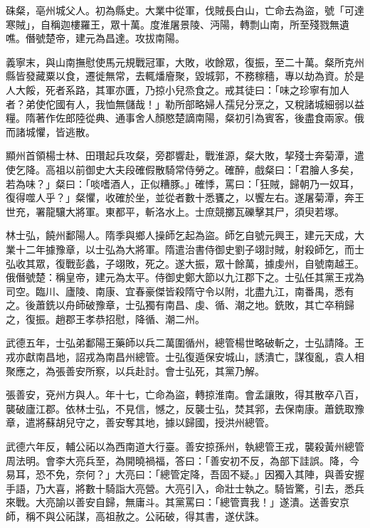 \begin{pinyinscope}
 硃粲，亳州城父人。初為縣史。大業中從軍，伐賊長白山，亡命去為盜，號「可達寒賊」，自稱迦樓羅王，眾十萬。度淮屠景陵、沔陽，轉剽山南，所至殘戮無遺噍。僭號楚帝，建元為昌達。攻拔南陽。



 義寧末，與山南撫慰使馬元規戰冠軍，大敗，收餘眾，復振，至二十萬。粲所克州縣皆發藏粟以食，遷徙無常，去輒燔廥聚，毀城郭，不務稼穡，專以劫為資。於是人大餒，死者系路，其軍亦匱，乃掠小兒烝食之。戒其徒曰：「味之珍寧有加人者？弟使佗國有人，我恤無儲哉！」勒所部略婦人孺兒分烹之，又稅諸城細弱以益糧。隋著作佐郎陸從典、通事舍人顏愍楚謫南陽，粲初引為賓客，後盡食兩家。俄而諸城懼，皆逃散。



 顯州首領楊士林、田瓚起兵攻粲，旁郡響赴，戰淮源，粲大敗，挈殘士奔菊潭，遣使乞降。高祖以前御史大夫段確假散騎常侍勞之。確醉，戲粲曰：「君膾人多矣，若為味？」粲曰：「啖嗜酒人，正似糟豚。」確悸，罵曰：「狂賊，歸朝乃一奴耳，復得噬人乎？」粲懼，收確於坐，並從者數十悉饔之，以饗左右。遂屠菊潭，奔王世充，署龍驤大將軍。東都平，斬洛水上。士庶競擲瓦礫擊其尸，須臾若塚。



 林士弘，饒州鄱陽人。隋季與鄉人操師乞起為盜。師乞自號元興王，建元天成，大業十二年據豫章，以士弘為大將軍。隋遣治書侍御史劉子翊討賊，射殺師乞，而士弘收其眾，復戰彭蠡，子翊敗，死之。遂大振，眾十餘萬，據虔州，自號南越王。俄僭號楚：稱皇帝，建元為太平。侍御史鄭大節以九江郡下之。士弘任其黨王戎為司空。臨川、廬陵、南康、宜春豪傑皆殺隋守令以附，北盡九江，南番禺，悉有之。後蕭銑以舟師破豫章，士弘獨有南昌、虔、循、潮之地。銑敗，其亡卒稍歸之，復振。趙郡王孝恭招慰，降循、潮二州。



 武德五年，士弘弟鄱陽王藥師以兵二萬圍循州，總管楊世略破斬之，士弘請降。王戎亦獻南昌地，詔戎為南昌州總管。士弘復遁保安城山，誘潰亡，謀復亂，袁人相聚應之，為張善安所察，以兵赴討。會士弘死，其黨乃解。



 張善安，兗州方與人。年十七，亡命為盜，轉掠淮南。會孟讓敗，得其散卒八百，襲破廬江郡。依林士弘，不見信，憾之，反襲士弘，焚其郛，去保南康。蕭銑取豫章，遣將蘇胡兒守之，善安奪其地，據以歸國，授洪州總管。



 武德六年反，輔公祏以為西南道大行臺。善安掠孫州，執總管王戎，襲殺黃州總管周法明。會李大亮兵至，為開曉禍福，答曰：「善安初不反，為部下詿誤。降，今易耳，恐不免，奈何？」大亮曰：「總管定降，吾固不疑。」因獨入其陣，與善安握手語，乃大喜，將數十騎詣大亮營。大亮引入，命壯士執之。騎皆驚，引去，悉兵來戰。大亮諭以善安自歸，無庸斗。其黨罵曰：「總管賣我！」遂潰。送善安京師，稱不與公祏謀，高祖赦之。公祏破，得其書，遂伏誅。




\end{pinyinscope}
